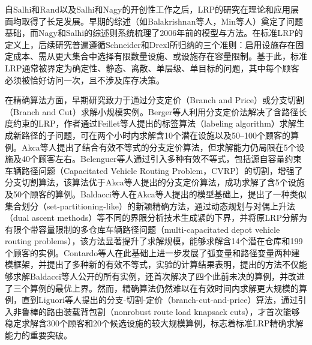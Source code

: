 \documentclass[fontset=none]{ctexart}
\begin{document}
自Salhi和Rand\cite{salhiEffectIgnoringRoutes1989}以及Salhi和Nagy\cite{salhiClusterInsertionHeuristic1999}的开创性工作之后，LRP的研究在理论和应用层面均取得了长足发展。早期的综述（如Balakrishnan等人\cite{balakrishnanIntegratedFacilityLocation1987}，Min等人\cite{minCombinedLocationroutingProblems1998}）奠定了问题基础，而Nagy和Salhi的综述则系统梳理了2006年前的模型与方法\cite{nagyLocationroutingIssuesModels2007}。在标准LRP的定义上，后续研究普遍遵循Schneider和Drexl所归纳的三个准则：启用设施存在固定成本、需从更大集合中选择有限数量设施、或设施存在容量限制\cite{schneiderSurveyStandardLocationrouting2017}。基于此，标准LRP通常被界定为确定性、静态、离散、单层级、单目标的问题，其中每个顾客必须被恰好访问一次，且不涉及库存决策\cite{drexlSurveyVariantsExtensions2015, cavagniniRecentDevelopmentsLocationrouting2026}。

在精确算法方面，早期研究致力于通过分支定价（Branch and Price）或分支切割（Branch and Cut）求解小规模实例。Berger等人利用分支定价法解决了含路径长度约束的LRP，作者通过Feillet等人提出的标签算法（labeling algorithm）求解生成新路径的子问题\cite{feilletExactAlgorithmElementary2004}，可在两个小时内求解含10个潜在设施以及50--100个顾客的算例\cite{bergerLocationRoutingProblemsDistance2007a}。Akca等人提出了结合有效不等式的分支定价算法，但求解能力仍局限在5个设施及40个顾客左右\cite{akcaBranchandPriceAlgorithmCombined2009}。Belenguer等人通过引入多种有效不等式，包括源自容量约束车辆路径问题（Capacitated Vehicle Routing Problem，CVRP）的切割，增强了分支切割算法，该算法优于Akca等人提出的分支定价算法\cite{akcaBranchandPriceAlgorithmCombined2009}，成功求解了含5个设施及50个顾客的算例\cite{belenguerBranchandCutMethodCapacitated2011}。Baldacci等人在Akca等人提出的模型基础上\cite{akcaBranchandPriceAlgorithmCombined2009}，提出了一种类似集合划分（set-partitioning-like）的新颖精确方法，通过动态规划与对偶上升法（dual ascent methods）等不同的界限分析技术生成紧的下界，并将原LRP分解为有限个带容量限制的多仓库车辆路径问题（multi-capacitated depot vehicle routing problems），该方法显著提升了求解规模，能够求解含14个潜在仓库和199个顾客的实例\cite{baldacciExactMethodCapacitated2011}。Contardo等人在此基础上进一步发展了弧变量和路径变量两种建模框架，并提出了多种新的有效不等式，实验的计算结果表明，提出的方法不仅能够求解Baldacci等人公开的所有实例\cite{baldacciExactMethodCapacitated2011}，还首次解决了四个此前未决的算例，并改进了三个算例的最优上界\cite{contardoComputationalComparisonFlow2013, contardoExactAlgorithmBased2014}。然而，精确算法仍然难以在有效时间内求解更大规模的算例，直到Liguori等人提出的分支-切割-定价（branch-cut-and-price）算法，通过引入非鲁棒的路由装载背包割（nonrobust route load knapsack cuts），才首次能够稳定求解含300个顾客和20个候选设施的较大规模算例，标志着标准LRP精确求解能力的重要突破\cite{liguoriNonrobustStrongKnapsack2023}。
\end{document}
